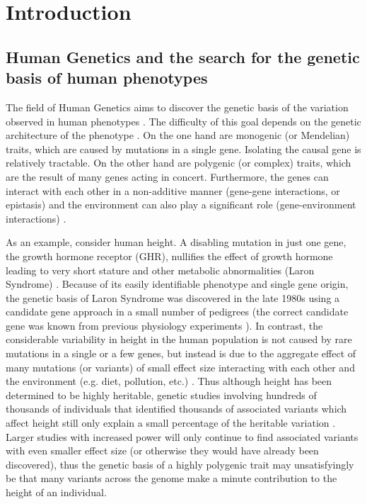 \chapter{Introduction}

\section{Human Genetics and the search for the genetic basis of human phenotypes}

The field of Human Genetics aims to discover the genetic basis of the
variation observed in human phenotypes \citep{Strachan2011}. The
difficulty of this goal depends on the genetic architecture of the
phenotype \citep{DiRienzo2006, Bodmer2008, Schork2009}. On the one
hand are monogenic (or Mendelian) traits, which are caused by
mutations in a single gene. Isolating the causal gene is relatively
tractable. On the other hand are polygenic (or complex) traits, which
are the result of many genes acting in concert. Furthermore, the genes
can interact with each other in a non-additive manner (gene-gene
interactions, or epistasis) \citep{Cordell2009, Mechanic2012} and the
environment can also play a significant role (gene-environment
interactions) \citep{Thomas2010, Ober2011}.

As an example, consider human height. A disabling mutation in just one
gene, the growth hormone receptor (GHR), nullifies the effect of
growth hormone leading to very short stature and other metabolic
abnormalities (Laron Syndrome) \citep{Laron2011}. Because of its
easily identifiable phenotype and single gene origin, the genetic
basis of Laron Syndrome was discovered in the late 1980s using a
candidate gene approach in a small number of pedigrees
\citep{Amselem1989, Godowski1989, Shevah2011} (the correct candidate
gene was known from previous physiology experiments
\citep{Eshet1984}). In contrast, the considerable variability in
height in the human population is not caused by rare mutations in a
single or a few genes, but instead is due to the aggregate effect of
many mutations (or variants) of small effect size interacting with
each other and the environment (e.g. diet, pollution, etc.)
\citep{Lettre2011, Turchin2012}. Thus although height has been
determined to be highly heritable, genetic studies involving hundreds
of thousands of individuals that identified thousands of associated
variants which affect height still only explain a small percentage of
the heritable variation \citep{LangoAllen2010, Wood2014}. Larger
studies with increased power will only continue to find associated
variants with even smaller effect size (or otherwise they would have
already been discovered), thus the genetic basis of a highly polygenic
trait may unsatisfyingly be that many variants across the genome make
a minute contribution to the height of an individual.

